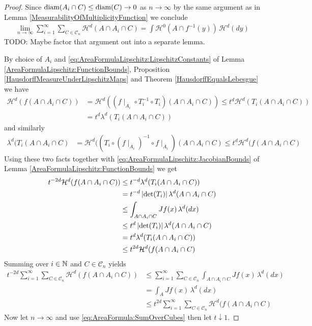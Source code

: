 \begin{proof}
Since $\operatorname*{diam}(A_i \cap C) \leq \operatorname*{diam}(C) \to 0$ as $n \to \infty$ by the same argument as in Lemma \ref{MeasurabilityOfMultiplicityFunction} we conclude
\begin{align}\label{eq:AreaFormula:SumOverCubes}
\lim_{n \to \infty} \sum_{i=1}^\infty \sum_{C \in \mathcal{C}_n} \mathcal{H}^d(A \cap A_i \cap C) = \int \mathcal{H}^0(A \cap f^{-1}(y)) \, \mathcal{H}^d(dy)
\end{align}
TODO: Maybe factor that argument out into a separate lemma.

By choice of $A_i$ and \eqref{eq:AreaFormulaLipschitz:LipschitzConstants} of Lemma \ref{AreaFormulaLipschitz:FunctionBounds}, Proposition \ref{HausdorffMeasureUnderLipschitzMaps} 
and Theorem \ref{HausdorffEqualsLebesgue} we have
\begin{align*}
\mathcal{H}^d(f(A \cap A_i \cap C)) &= \mathcal{H}^d((f\mid_{A_i} \circ T_i^{-1} \circ T_i)(A \cap A_i \cap C)) \leq t^d \mathcal{H}^d(T_i(A \cap A_i \cap C)) \\
&=  t^d \lambda^d(T_i(A \cap A_i \cap C))
\end{align*}
and similarly 
\begin{align*}
\lambda^d(T_i(A \cap A_i \cap C) &= \mathcal{H}^d((T_i \circ (f\mid_{A_i})^{-1} \circ f\mid_{A_i})(A \cap A_i \cap C) \leq t^d \mathcal{H}^d(f(A \cap A_i \cap C)
\end{align*}
Using these two facts together with \eqref{eq:AreaFormulaLipschitz:JacobianBounds} of Lemma \ref{AreaFormulaLipschitz:FunctionBounds} we get
\begin{align*}
t^{-2d} \mathcal{H}^d(f(A \cap A_i \cap C)) &\leq t^{-d} \lambda^d(T_i(A \cap A_i \cap C)) \\
&= t^{-d} \left \vert \det(T_i) \right \vert \lambda^d(A \cap A_i \cap C) \\
&\leq \int_{A \cap A_i \cap C} Jf(x) \, \lambda^d(dx) \\
&\leq t^{d} \left \vert \det(T_i) \right \vert \lambda^d(A \cap A_i \cap C) \\
&= t^{d} \lambda^d(T_i(A \cap A_i \cap C)) \\
&\leq t^{2d} \mathcal{H}^d(f(A \cap A_i \cap C)
\end{align*}
Summing over $i \in \mathbb{N}$ and $C \in \mathcal{C}_n$ yields
\begin{align*}
t^{-2d} \sum_{i=1}^\infty \sum_{C \in \mathcal{C}_n} \mathcal{H}^d(f(A \cap A_i \cap C)) 
&\leq \sum_{i=1}^\infty \sum_{C \in \mathcal{C}_n} \int_{A \cap A_i \cap C} Jf(x) \, \lambda^d(dx) \\
&= \int_A  Jf(x) \, \lambda^d(dx) \\
&\leq t^{2d} \sum_{i=1}^\infty \sum_{C \in \mathcal{C}_n}\mathcal{H}^d(f(A \cap A_i \cap C) 
\end{align*}
Now let $n \to \infty$ and use \eqref{eq:AreaFormula:SumOverCubes} then let $t \downarrow 1$.


\end{proof}
